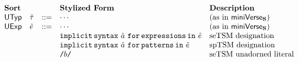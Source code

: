 \[\begin{array}{lllllll}
\textbf{Sort} & & 
& \textbf{Stylized Form} & \textbf{Description}\\
\mathsf{UTyp} & {\hat\tau} & ::= 
& \cdots & \text{(as in $\mathsf{miniVerse}_\textbf{S}$)}\\
\mathsf{UExp} & {\hat e} & ::= 
& \cdots & \text{(as in $\mathsf{miniVerse}_\textbf{S}$)}\\
&&& \texttt{implicit\,syntax}~\hat{a}~\texttt{for\,expressions\,in}~{\hat e} & \text{seTSM designation}\\
&&& \texttt{implicit\,syntax}~\hat{a}~\texttt{for\,patterns\,in}~{\hat e} & \text{spTSM designation}\\
&&& {\texttt{/}b\texttt{/}} & \text{seTSM unadorned literal}\\

\end{array}\]
